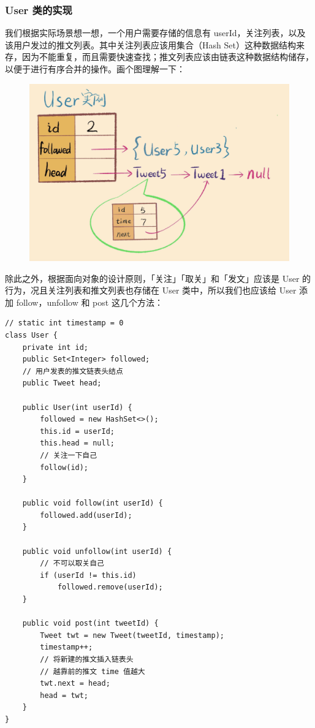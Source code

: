 \documentclass[12pt]{article}
\begin{document}
\subsubsection{User 类的实现}
我们根据实际场景想一想，一个用户需要存储的信息有 userId，关注列表，以及该用户发过的推文列表。其中关注列表应该用集合（Hash Set）这种数据结构来存，因为不能重复，而且需要快速查找；推文列表应该由链表这种数据结构储存，以便于进行有序合并的操作。画个图理解一下：
\begin{figure}[H]
    \centering
    \includegraphics[width=.5\textwidth]{fig/Twitter_Design_1.png}
\end{figure}

除此之外，根据面向对象的设计原则，「关注」「取关」和「发文」应该是 User 的行为，况且关注列表和推文列表也存储在 User 类中，所以我们也应该给 User 添加 follow，unfollow 和 post 这几个方法：
\begin{lstlisting}
// static int timestamp = 0
class User {
    private int id;
    public Set<Integer> followed;
    // 用户发表的推文链表头结点
    public Tweet head;

    public User(int userId) {
        followed = new HashSet<>();
        this.id = userId;
        this.head = null;
        // 关注一下自己
        follow(id);
    }

    public void follow(int userId) {
        followed.add(userId);
    }

    public void unfollow(int userId) {
        // 不可以取关自己
        if (userId != this.id)
            followed.remove(userId);
    }

    public void post(int tweetId) {
        Tweet twt = new Tweet(tweetId, timestamp);
        timestamp++;
        // 将新建的推文插入链表头
        // 越靠前的推文 time 值越大
        twt.next = head;
        head = twt;
    }
}
\end{lstlisting}
\end{document}
